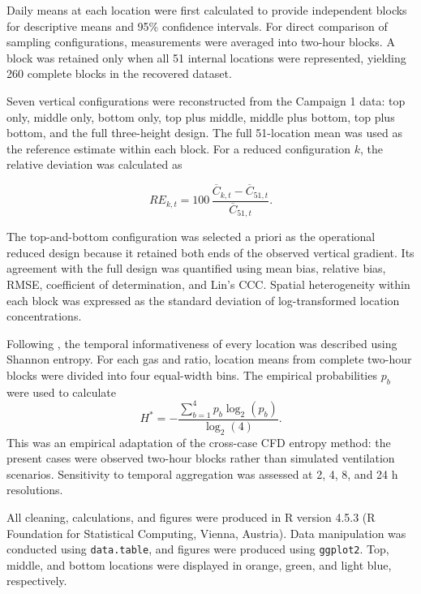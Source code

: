 \documentclass[12pt,a4paper]{article}
\begin{document}
Daily means at each location were first calculated to provide independent
blocks for descriptive means and 95\% confidence intervals. For direct
comparison of sampling configurations, measurements were averaged into
two-hour blocks. A block was retained only when all 51 internal locations
were represented, yielding 260 complete blocks in the recovered dataset.

Seven vertical configurations were reconstructed from the Campaign 1 data:
top only, middle only, bottom only, top plus middle, middle plus bottom, top
plus bottom, and the full three-height design. The full 51-location mean was
used as the reference estimate within each block. For a reduced configuration
\(k\), the relative deviation was calculated as

\begin{equation}
RE_{k,t}=100\,
\frac{\overline{C}_{k,t}-\overline{C}_{51,t}}
     {\overline{C}_{51,t}}.
\end{equation}

The top-and-bottom configuration was selected a priori as the operational
reduced design because it retained both ends of the observed vertical
gradient. Its agreement with the full design was quantified using mean bias,
relative bias, RMSE, coefficient of determination, and Lin's CCC. Spatial
heterogeneity within each block was expressed as the standard deviation of
log-transformed location concentrations.

Following \citet{Chen2026}, the temporal informativeness of every location was
described using Shannon entropy. For each gas and ratio, location means from
complete two-hour blocks were divided into four equal-width bins. The
empirical probabilities \(p_b\) were used to calculate
\begin{equation}
H^*=-\frac{\sum_{b=1}^{4}p_b\log_2(p_b)}{\log_2(4)}.
\end{equation}
This was an empirical adaptation of the cross-case CFD entropy method: the
present cases were observed two-hour blocks rather than simulated ventilation
scenarios. Sensitivity to temporal aggregation was assessed at 2, 4, 8, and
24 h resolutions.

All cleaning, calculations, and figures were produced in R version 4.5.3
(R Foundation for Statistical Computing, Vienna, Austria). Data manipulation
was conducted using \texttt{data.table}, and figures were produced using
\texttt{ggplot2}. Top, middle, and bottom locations were displayed in orange,
green, and light blue, respectively.
\end{document}
